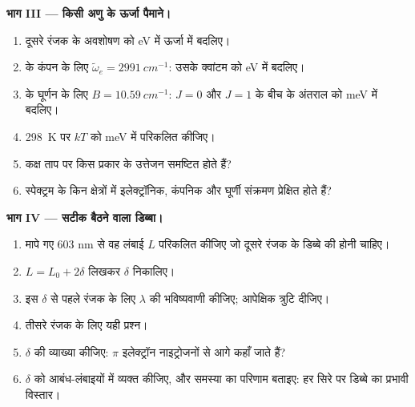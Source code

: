 \begin{problem}
\medskip\noindent\textbf{भाग III --- किसी अणु के ऊर्जा पैमाने।}
\begin{enumerate}[resume]
  \item दूसरे रंजक के अवशोषण को eV में ऊर्जा में बदलिए।
  \item {} के कंपन के लिए $\tilde\omega_e = \qty{2991}{cm^{-1}}$:
        उसके क्वांटम को eV में बदलिए।
  \item {} के घूर्णन के लिए $B = \qty{10.59}{cm^{-1}}$: $J = 0$ और $J = 1$ के बीच के
        अंतराल को \unit{meV} में बदलिए।
  \item \qty{298}{K} पर $kT$ को \unit{meV} में परिकलित कीजिए।
  \item कक्ष ताप पर किस प्रकार के उत्तेजन समष्टित होते हैं?
  \item स्पेक्ट्रम के किन क्षेत्रों में इलेक्ट्रॉनिक, कंपनिक और
        घूर्णी संक्रमण प्रेक्षित होते हैं?
\end{enumerate}

\medskip\noindent\textbf{भाग IV --- सटीक बैठने वाला डिब्बा।}
\begin{enumerate}[resume]
  \item मापे गए 603 nm से वह लंबाई $L$ परिकलित कीजिए जो दूसरे रंजक के
        डिब्बे की होनी चाहिए।
  \item $L = L_0 + 2\delta$ लिखकर $\delta$ निकालिए।
  \item इस $\delta$ से पहले रंजक के लिए $\lambda$ की भविष्यवाणी कीजिए; आपेक्षिक
        त्रुटि दीजिए।
  \item तीसरे रंजक के लिए यही प्रश्न।
  \item $\delta$ की व्याख्या कीजिए: $\pi$ इलेक्ट्रॉन नाइट्रोजनों से आगे कहाँ
        जाते हैं?
  \item $\delta$ को आबंध-लंबाइयों में व्यक्त कीजिए, और समस्या का परिणाम
        बताइए: हर सिरे पर डिब्बे का प्रभावी विस्तार।
\end{enumerate}
\end{problem}
